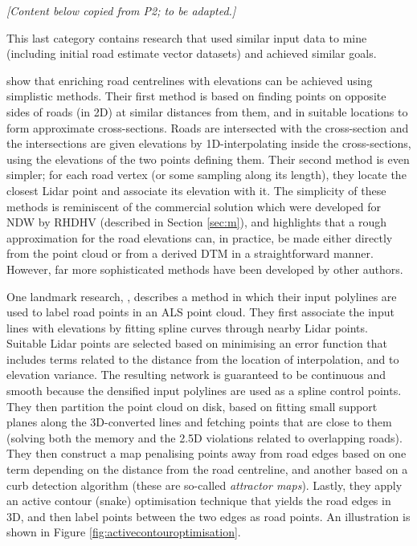 \textit{[Content below copied from P2; to be adapted.]}

This last category contains research that used similar input data to mine (including initial road estimate vector datasets) and achieved similar goals.

\cite{cai_rasdorf_2008} show that enriching road centrelines with elevations can be achieved using simplistic methods. Their first method is based on finding points on opposite sides of roads (in 2D) at similar distances from them, and in suitable locations to form approximate cross-sections. Roads are intersected with the cross-section and the intersections are given elevations by 1D-interpolating inside the cross-sections, using the elevations of the two points defining them. Their second method is even simpler; for each road vertex  (or some sampling along its length), they locate the closest Lidar point and associate its elevation with it. The simplicity of these methods is reminiscent of the commercial solution which were developed for NDW by RHDHV (described in Section \ref{sec:m}), and highlights that a rough approximation for the road elevations can, in practice, be made either directly from the point cloud or from a derived DTM in a straightforward manner. However, far more sophisticated methods have been developed by other authors.

One landmark research, \cite{boyko_funkhauser_2011}, describes a method in which their input polylines are used to label road points in an ALS point cloud. They first associate the input lines with elevations by fitting spline curves through nearby Lidar points. Suitable Lidar points are selected based on minimising an error function that includes terms related to the distance from the location of interpolation, and to elevation variance. The resulting network is guaranteed to be continuous and smooth because the densified input polylines are used as a spline control points. They then partition the point cloud on disk, based on fitting small support planes along the 3D-converted lines and fetching points that are close to them (solving both the memory and the 2.5D violations related to overlapping roads). They then construct a map penalising points away from road edges based on one term depending on the distance from the road centreline, and another based on a curb detection algorithm (these are so-called \textit{attractor maps}). Lastly, they apply an active contour (snake) optimisation technique that yields the road edges in 3D, and then label points between the two edges as road points. An illustration is shown in Figure \ref{fig:activecontouroptimisation}.

